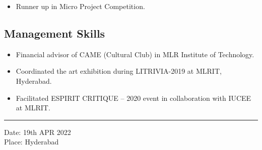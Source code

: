 \documentclass[
  letterpaper,
  DIV=11,
  numbers=noendperiod]{scrartcl}
\providecommand{\tightlist}{%
  \setlength{\itemsep}{0pt}\setlength{\parskip}{0pt}}\usepackage{longtable,booktabs,array}
\begin{document}
\begin{itemize}
\tightlist
\item
  Runner up in Micro Project Competition.
\end{itemize}

\hypertarget{management-skills}{%
\subsection{Management Skills}\label{management-skills}}

\begin{itemize}
\tightlist
\item
  Financial advisor of CAME (Cultural Club) in MLR Institute of
  Technology.
\item
  Coordinated the art exhibition during LITRIVIA-2019 at MLRIT,
  Hyderabad.
\item
  Facilitated ESPIRIT CRITIQUE -- 2020 event in collaboration with IUCEE
  at MLRIT.
\end{itemize}

\begin{center}\rule{0.5\linewidth}{0.5pt}\end{center}

Date: 19th APR 2022\\
Place: Hyderabad
\end{document}
